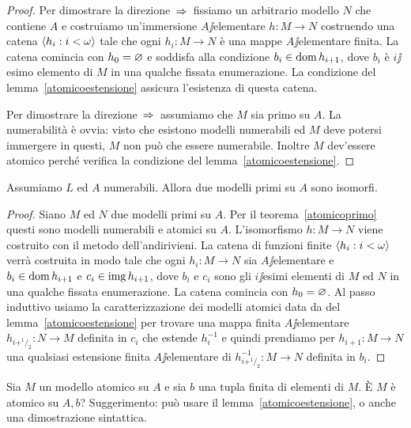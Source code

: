 \begin{proof}
Per dimostrare la direzione $\,\Rightarrow\,$ fissiamo un arbitrario modello $N$ che contiene $A$ e costruiamo un'immersione $A\jj$elementare $h:M\to N$ costruendo una catena $\langle h_i:i<\omega\rangle$ tale che ogni $h_i:M\to N$ \`e una mappe $A\jj$elementare finita. La catena comincia con $h_0=\varnothing$ e soddisfa alla condizione $b_i\in\mathop{\rm dom} h_{i+1}$, dove $b_i$ \`e $i\jj$esimo elemento di $M$ in una qualche fissata enumerazione. La condizione  del lemma~\ref{atomicoestensione} assicura l'esistenza di questa catena. 

Per dimostrare la direzione $\,\Rightarrow\,$ assumiamo che $M$ sia primo su $A$. La numerabilit\`a \`e ovvia: visto che esistono modelli numerabili ed $M$ deve potersi immergere in questi, $M$ non pu\`o che essere numerabile. Inoltre $M$ dev'essere atomico perch\'e verifica la condizione  del lemma~\ref{atomicoestensione}.
\end{proof}

\begin{theorem}\label{primiisomorfi}
Assumiamo $L$ ed $A$ numerabili. Allora due modelli primi su $A$ sono isomorfi.
\end{theorem}

\begin{proof} 
Siano $M$ ed $N$ due modelli primi su $A$. Per il teorema~\ref{atomicoprimo} questi sono modelli numerabili e atomici su $A$.  L'isomorfismo $h:M\to N$ viene costruito con il metodo dell'andirivieni. La catena di funzioni finite $\langle h_i:i<\omega\rangle$ verr\`a costruita in modo tale che ogni $h_i:M\to N$ sia $A\jj$elementare e $b_i\in\mathop{\rm dom} h_{i+1}$ e $c_i\in\mathop{\rm img} h_{i+1}$, dove $b_i$ e $c_i$ sono gli $i\jj$esimi elementi di $M$ ed $N$ in una qualche fissata enumerazione. La catena comincia con $h_0=\varnothing$. Al passo induttivo usiamo la caratterizzazione dei modelli atomici data da  del lemma~\ref{atomicoestensione} per trovare una mappa finita $A\jj$elementare $h_{i+^1\!/_2}:N\to M$ definita in $c_i$ che estende $h^{-1}_i$ e quindi prendiamo per $h_{i+1}:M\to N$ una qualsiasi estensione finita $A\jj$elementare di $h_{i+^1\!/_2}^{-1}:M\to N$ definita in $b_i$.
\end{proof}

\begin{exercise}
Sia $M$ un modello atomico su $A$ e sia $b$ una tupla finita di elementi di $M$. \`E $M$ \`e atomico su $A,b$? Suggerimento: pu\`o usare il lemma~\ref{atomicoestensione}, o anche una dimostrazione sintattica.\QED
\end{exercise}

